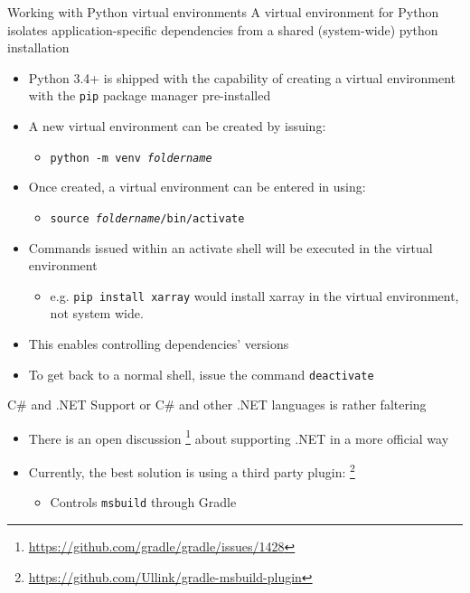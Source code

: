 \documentclass[presentation]{beamer}
\newcommand{\fnurl}[1]{\footnote{\url{#1}}}
\begin{document}
\begin{frame}[fragile]{Working with Python virtual environments}
    A virtual environment for Python isolates application-specific dependencies from a shared (system-wide) python installation
    \begin{itemize}
        \item Python 3.4+ is shipped with the capability of creating a virtual environment with the \texttt{pip} package manager pre-installed
        \item A new virtual environment can be created by issuing:
        \begin{itemize}
            \item \texttt{python -m venv \textit{foldername}}
        \end{itemize}
        \item Once created, a virtual environment can be entered in using:
        \begin{itemize}
            \item \texttt{source \textit{foldername}/bin/activate}
        \end{itemize}
        \item Commands issued within an activate shell will be executed in the virtual environment
        \begin{itemize}
            \item e.g. \texttt{pip install xarray} would install xarray in the virtual environment, not system wide.
        \end{itemize}
        \item This enables controlling dependencies' versions
        \item To get back to a normal shell, issue the command \texttt{deactivate}
    \end{itemize}
\end{frame}

\begin{frame}[fragile]{C\# and .NET}
    Support or C\# and other .NET languages is rather faltering
    \begin{itemize}
        \item There is an open discussion \fnurl{https://github.com/gradle/gradle/issues/1428} about supporting .NET in a more official way
        \item Currently, the best solution is using a third party plugin: \fnurl{https://github.com/Ullink/gradle-msbuild-plugin}
        \begin{itemize}
            \item Controls \texttt{msbuild} through Gradle
        \end{itemize}
    \end{itemize}
\end{frame}
\end{document}
